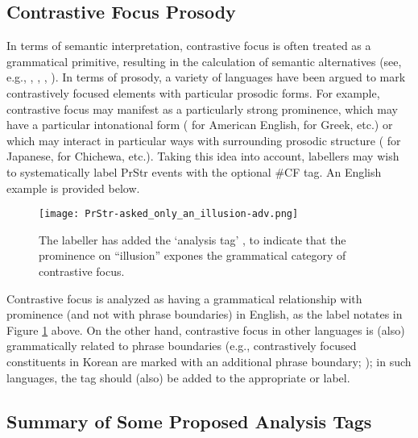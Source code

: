 \subsection{Contrastive Focus Prosody}\label{sec:contrastive-focus-prosody}

In terms of semantic interpretation, contrastive focus is often treated as a grammatical primitive, resulting in the calculation of semantic alternatives (see, e.g., \citealt{rooth92}, \citealt{truckenbrodt95}, \citealt{wagner05}, \citealt{kratzerselkirk20}). In terms of prosody, a variety of languages have been argued to mark contrastively focused elements with particular prosodic forms. For example, contrastive focus may manifest as a particularly strong prominence, which may have a particular intonational form (\citealt{pierrehumberthirschberg90} for American English, \citealt{baltazanijun99} for Greek, etc.) or which may interact in particular ways with surrounding prosodic structure (\citealt{ishihara07} for Japanese, \citealt{kanerva90} for Chichewa, etc.). Taking this idea into account, labellers may wish to systematically label PrStr events with the optional \#CF tag. An English example is provided below.

\begin{figure}[H]
\centering
%
\texttt{[image: PrStr-asked\_only\_an\_illusion-adv.png]}
%
\caption{The labeller has added the ‘analysis tag’ , to indicate that the prominence on “illusion” expones the grammatical category of contrastive focus.%
\label{fig:only_an_illusion Beyond}%
}
\end{figure}


Contrastive focus is analyzed as having a grammatical relationship with prominence (and not with phrase boundaries) in English, as the  label notates in Figure \ref{fig:only_an_illusion Beyond} above. On the other hand, contrastive focus in other languages is (also) grammatically related to phrase boundaries (e.g., contrastively focused constituents in Korean are marked with an additional phrase boundary; \citealt{jeonnolan17}); in such languages, the  tag should (also) be added to the appropriate \textlabel{]} or \textlabel{[} label.

\subsection{Summary of Some Proposed Analysis Tags}\label{sec:summary-of-some-proposed-analysis-tags}

